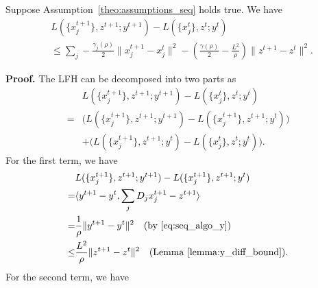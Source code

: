 \begin{lemma}\label{lemma:L_iter_diff}
Suppose Assumption~\ref{theo:assumptions_seq} holds true. We have
\begin{align}
    & L(\{x_j^{t+1}\},z^{t+1};y^{t+1}) - L(\{x_j^{t}\},z^{t};y^{t})\nonumber\\
    & \le \sum_j -\frac{\gamma_j(\rho)}{2}\|x_j^{t+1} - x_j^t\|^2 - \left(\frac{\gamma(\rho)}{2} - \frac{L^2}{\rho}\right)\|z^{t+1} - z^t\|^2. \nonumber
\end{align}
\end{lemma}
{\bf Proof.} The LFH can be decomposed into two parts as
\begin{align}
    & L(\{x_j^{t+1}\},z^{t+1};y^{t+1}) - L(\{x_j^{t}\},z^{t};y^{t})\nonumber\\
    = & \big(L(\{x_j^{t+1}\},z^{t+1};y^{t+1}) - L(\{x_j^{t+1}\},z^{t+1};y^{t})\big)\nonumber\\
    & + \big(L(\{x_j^{t+1}\},z^{t+1};y^{t}) - L(\{x_j^{t}\},z^{t};y^{t})\big). \label{eq:proof_diff_L_0_seq}
\end{align}
For the first term, we have
\begin{align}
    & L(\{x_j^{t+1}\},z^{t+1};y^{t+1}) - L(\{x_j^{t+1}\},z^{t+1};y^{t})\nonumber\\
    = & \langle y^{t+1} - y^t , \sum_jD_jx_j^{t+1} - z^{t+1}\rangle\nonumber\\
    = & \frac{1}{\rho}\|y^{t+1} - y^t\|^2\quad\text{(by \eqref{eq:seq_algo_y})}\nonumber\\
    \le & \frac{L^2}{\rho}\|z^{t+1} - z^t\|^2\quad\text{(Lemma~\ref{lemma:y_diff_bound})}\label{eq:proof_diff_L_1_seq}.
\end{align}
For the second term, we have
